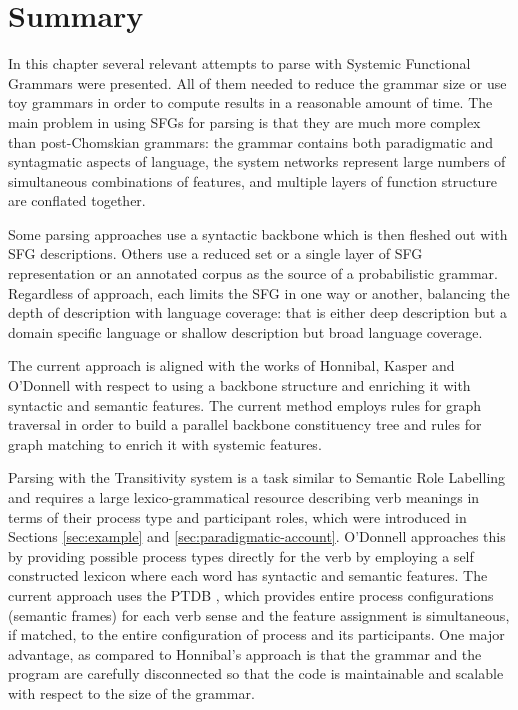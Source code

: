 \section{Summary}
In this chapter several relevant attempts to parse with Systemic Functional Grammars were presented. All of them needed to reduce the grammar size or use toy grammars in order to compute results in a reasonable amount of time. The main problem in using SFGs for parsing is that they are much more complex than post-Chomskian grammars: the grammar contains both paradigmatic and syntagmatic aspects of language, the system networks represent large numbers of simultaneous combinations of features, and multiple layers of function structure are conflated together. 

Some parsing approaches use a syntactic backbone which is then fleshed out with SFG descriptions. Others use a reduced set or a single layer of SFG representation or an annotated corpus as the source of a probabilistic grammar. Regardless of approach, each limits the SFG in one way or another, balancing the depth of description with language coverage: that is either deep description but a domain specific language or shallow description but broad language coverage. 

The current approach is aligned with the works of Honnibal, Kasper and O'Donnell with respect to using a backbone structure and enriching it with syntactic and semantic features. The current method employs rules for graph traversal in order to build a parallel backbone constituency tree and rules for graph matching to enrich it with systemic features. 

Parsing with the Transitivity system is a task similar to Semantic Role Labelling and requires a large lexico-grammatical resource describing verb meanings in terms of their process type and participant roles, which were introduced in Sections \ref{sec:example} and \ref{sec:paradigmatic-account}. O'Donnell approaches this by providing possible process types directly for the verb by employing a self constructed lexicon where each word has syntactic and semantic features. The current approach uses the PTDB \citep{Neale2002}, which provides entire process configurations (semantic frames) for each verb sense and the feature assignment is simultaneous, if matched, to the entire configuration of process and its participants.
One major advantage, as compared to Honnibal's approach is that the grammar and the program are carefully disconnected so that the code is maintainable and scalable with respect to the size of the grammar. 

